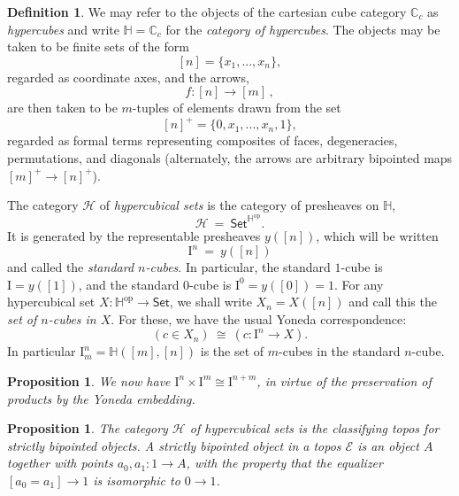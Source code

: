 \documentclass[11pt]{article}
\newcommand{\C}{\ensuremath{\mathbb{C}}}
\newcommand{\psh}[1]{\ensuremath{\mathsf{Set}^{#1^{\mathrm{op}}}}}
\newcommand{\Set}{\ensuremath{\mathsf{Set}}}
\newcommand{\I}{\ensuremath{\mathrm{I}}}
\renewcommand{\H}{\ensuremath{\mathbb{H}}}
\newcommand{\HH}{\ensuremath{\mathcal{H}}}
\newtheorem{proposition}[theorem]{Proposition}
\theoremstyle{remark}
\theoremstyle{definition}
\newtheorem{definition}[theorem]{Definition}
\begin{document}
\begin{definition}
We may refer to the objects of the cartesian cube category $\C_c $ as \emph{hypercubes} and write $\H = \C_c$ for the \emph{category of hypercubes}.  The objects may be taken to be finite sets of the form $$[n] = \{x_1, ..., x_n\},$$ regarded as coordinate axes, and the arrows,
\[
f : [n] \to [m]\,,
\]
are then taken to be $m$-tuples of elements drawn from the set $$[n]^+ = \{0, x_1, ..., x_n, 1\},$$ regarded as formal terms representing composites of faces, degeneracies, permutations, and diagonals (alternately, the arrows are arbitrary bipointed maps $[m]^+\to [n]^+$).

The category $\HH$ of \emph{hypercubical sets} is  the category of presheaves on $\H$,
\[
\HH\ =\ \psh{\H}.
\]
It is generated by the representable presheaves $y([n])$, which will be written
$$\I^n\ =\ y([n])$$ 
and called the \emph{standard $n$-cubes}.  In particular, the standard $1$-cube is $\I = y([1])$, and the standard $0$-cube is $\I^0 = y([0])=1$.  For any hypercubical set $X: \H^\mathrm{op} \to \Set$, we shall write $X_n = X([n])$ and call this the \emph{set of $n$-cubes in $X$}.  For these, we have the usual Yoneda correspondence:
\[
(c \in X_n ) \ \cong\ (c : \I^n \to X).
\]
In particular $\I^n_m = \H([m],[n])$ is the set of $m$-cubes in the standard $n$-cube.
\end{definition}

\begin{proposition}
We now have $\I^n \times \I^m \cong \I^{n+m}$, in virtue of the preservation of products by the Yoneda embedding.
\end{proposition}

\begin{proposition}
The category $\HH$ of hypercubical sets is the classifying topos for \emph{strictly} bipointed objects.  A strictly bipointed object in a topos $\mathcal{E}$ is an object $A$ together with points $a_0, a_1 : 1\to A$, with the property that the equalizer $[a_0 = a_1] \to 1$ is isomorphic to $0\to 1$.
\end{proposition}
\end{document}
